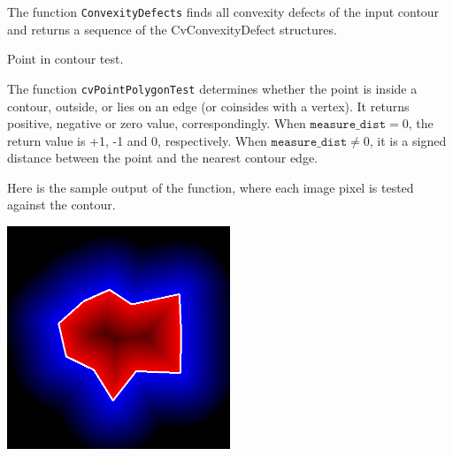 \begin{description}
\end{description}

The function \texttt{ConvexityDefects} finds all convexity defects of the input contour and returns a sequence of the CvConvexityDefect structures.

\label{PointPolygonTest}

Point in contour test.


\begin{description}
\end{description}

The function \texttt{cvPointPolygonTest} determines whether the
point is inside a contour, outside, or lies on an edge (or coinsides
with a vertex). It returns positive, negative or zero value,
correspondingly. When $\texttt{measure\_dist} =0$, the return value
is +1, -1 and 0, respectively. When $\texttt{measure\_dist} \ne 0$,
it is a signed distance between the point and the nearest contour
edge.

Here is the sample output of the function, where each image pixel is tested against the contour.

\includegraphics[width=0.5\textwidth]{pics/pointpolygon.png}

